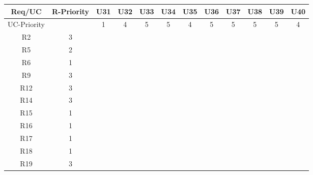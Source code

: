 \documentclass[12pt]{article}
\begin{document}
	\newpage
	\begin{longtable}{|c|c|c|c|c|c|c|c|c|c|c|c|}
		\hline
		Req/UC      & R-Priority & U31      & U32      & U33      & U34      & U35      & U36      & U37      & U38      & U39      & U40      \\
		\hline
		UC-Priority &            & 1         & 4         & 5         & 5         & 4         & 5         & 5         & 5         & 5         & 4         \\
		\hline
		R2          & 3          &           &           &           &           &           &           &           &           &           &           \\
		\hline
		R5          & 2          &           &           &           &           &           &           &           &           &           &           \\
		\hline
		R6          & 1          &           &           &           &           &           &           &           &           &           &           \\
		\hline
		R9          & 3          &           &           &           &           &           &           &           &           &           &           \\
		\hline
		R12         & 3          &           &           &           &           &           &           &           &           & \ding{51} &           \\
		\hline
		R14         & 3          &           &           &           &           &           &           &           &           &           &           \\
		\hline
		R15         & 1          &           &           &           &           &           &           &           &           &           &           \\
		\hline
		R16         & 1          &           &           &           &           &           &           &           &           &           &           \\
		\hline
		R17         & 1          &           &           &           &           &           &           &           &           &           &           \\
		\hline
		R18         & 1          &           &           &           &           &           &           &           &           &           &           \\
		\hline
		R19         & 3          &           &           &           &           &           &           &           &           &           &           \\

\end{longtable}
\end{document}
